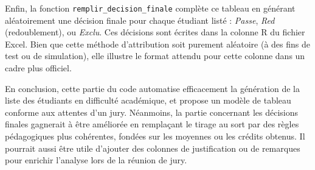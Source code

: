 Enfin, la fonction \texttt{remplir\_decision\_finale} complète ce tableau en générant aléatoirement une décision finale pour chaque étudiant listé : \textit{Passe}, \textit{Red} (redoublement), ou \textit{Exclu}. Ces décisions sont écrites dans la colonne R du fichier Excel. Bien que cette méthode d’attribution soit purement aléatoire (à des fins de test ou de simulation), elle illustre le format attendu pour cette colonne dans un cadre plus officiel.

En conclusion, cette partie du code automatise efficacement la génération de la liste des étudiants en difficulté académique, et propose un modèle de tableau conforme aux attentes d’un jury. Néanmoins, la partie concernant les décisions finales gagnerait à être améliorée en remplaçant le tirage au sort par des règles pédagogiques plus cohérentes, fondées sur les moyennes ou les crédits obtenus. Il pourrait aussi être utile d'ajouter des colonnes de justification ou de remarques pour enrichir l’analyse lors de la réunion de jury.

